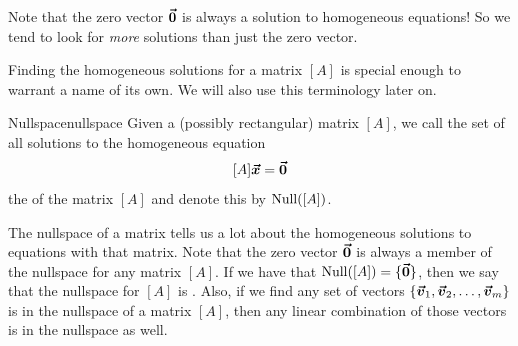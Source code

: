         \begin{remark}
        Note that the zero vector $\boldsymbol{\vec{0}}$ is always a solution to homogeneous equations! So we tend to look for \emph{more} solutions than just the zero vector.
        \end{remark}
        
        Finding the homogeneous solutions for a matrix $[A]$ is special enough to warrant a name of its own.  We will also use this terminology later on.
        
        \begin{df}{Nullspace}{nullspace}
            Given a (possibly rectangular) matrix $[A]$, we call the set of all solutions to the homogeneous equation
            \[
            [A]\boldsymbol{\boldsymbol{\vec{x}}} = \boldsymbol{\vec{0}}
            \]
            the  of the matrix $[A]$ and denote this by $\mathrm{Null}([A])$.
        \end{df}
        The nullspace of a matrix tells us a lot about the homogeneous solutions to equations with that matrix.  Note that the zero vector $\boldsymbol{\vec{0}}$ is always a member of the nullspace for any matrix $[A]$.  If we have that $\mathrm{Null}([A])=\{\boldsymbol{\vec{0}}\}$, then we say that the nullspace for $[A]$ is .  Also, if we find any set of vectors $\{\boldsymbol{\boldsymbol{\vec{v}}}_1,\boldsymbol{\boldsymbol{\vec{v}}}_2,\dots,\boldsymbol{\boldsymbol{\vec{v}}}_m\}$ is in the nullspace of a matrix $[A]$, then any linear combination of those vectors is in the nullspace as well.
        
